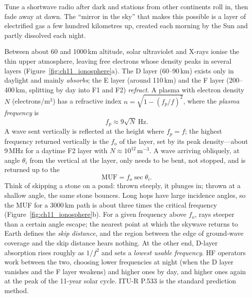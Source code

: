 Tune a shortwave radio after dark and stations from other continents roll in, then fade away at
dawn. The ``mirror in the sky'' that makes this possible is a layer of electrified gas a few
hundred kilometres up, created each morning by the Sun and partly dissolved each night.

Between about 60 and 1000\,km altitude, solar ultraviolet and X-rays ionise the thin upper
atmosphere, leaving free electrons whose density peaks in several layers
(Figure~\ref{fig:ch11_ionosphere}a). The D layer (60--90\,km) exists only in daylight and mainly
\emph{absorbs}; the E layer (around 110\,km) and the F layer (200--400\,km, splitting by day into
F1 and F2) \emph{refract}. A plasma with electron density $N$ (electrons/m$^3$) has a refractive
index $n=\sqrt{1-(f_p/f)^2}$, where the \emph{plasma frequency} is
\begin{equation}
f_p\approx 9\sqrt{N}\ \text{Hz}.
\end{equation}
A wave sent vertically is reflected at the height where $f_p=f$; the highest frequency returned
vertically is the  $f_o$ of the layer, set by its peak density---about
9\,MHz for a daytime F2 layer with $N\approx10^{12}$\,m$^{-3}$. A wave arriving obliquely, at angle
$\theta_i$ from the vertical at the layer, only needs to be bent, not stopped, and is returned
up to the 
\begin{equation}
\mathrm{MUF}=f_o\sec\theta_i .
\end{equation}
Think of skipping a stone on a pond: thrown steeply, it plunges in; thrown at a shallow angle,
the same stone bounces. Long hops have large incidence angles, so the MUF for a 3000\,km path is
about three times the critical frequency (Figure~\ref{fig:ch11_ionosphere}b). For a given
frequency above $f_o$, rays steeper than a certain angle escape; the nearest point at which the
skywave returns to Earth defines the \emph{skip distance}, and the region between the edge of
ground-wave coverage and the skip distance hears nothing. At the other end, D-layer absorption
rises roughly as $1/f^2$ and sets a \emph{lowest usable frequency}. HF operators work between the
two, choosing lower frequencies at night (when the D layer vanishes and the F layer weakens) and
higher ones by day, and higher ones again at the peak of the 11-year solar cycle. ITU-R P.533 is
the standard prediction method.


